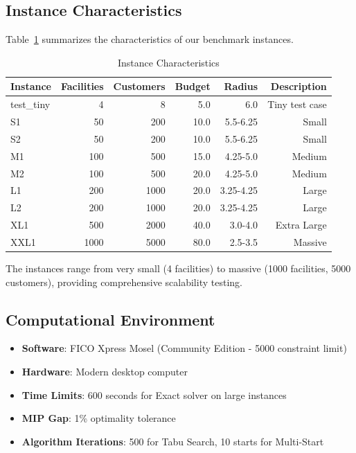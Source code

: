 \documentclass[11pt,a4paper]{article}
\begin{document}
\subsection{Instance Characteristics}

Table~\ref{tab:instances} summarizes the characteristics of our benchmark instances.

\begin{table}[h]
\centering
\caption{Instance Characteristics}
\label{tab:instances}
\begin{tabular}{lrrrrr}
\toprule
Instance & Facilities & Customers & Budget & Radius & Description \\
\midrule
test\_tiny & 4 & 8 & 5.0 & 6.0 & Tiny test case \\
S1 & 50 & 200 & 10.0 & 5.5-6.25 & Small \\
S2 & 50 & 200 & 10.0 & 5.5-6.25 & Small \\
M1 & 100 & 500 & 15.0 & 4.25-5.0 & Medium \\
M2 & 100 & 500 & 20.0 & 4.25-5.0 & Medium \\
L1 & 200 & 1000 & 20.0 & 3.25-4.25 & Large \\
L2 & 200 & 1000 & 20.0 & 3.25-4.25 & Large \\
XL1 & 500 & 2000 & 40.0 & 3.0-4.0 & Extra Large \\
XXL1 & 1000 & 5000 & 80.0 & 2.5-3.5 & Massive \\
\bottomrule
\end{tabular}
\end{table}

The instances range from very small (4 facilities) to massive (1000 facilities, 5000 customers), providing comprehensive scalability testing.

\subsection{Computational Environment}

\begin{itemize}
  \item \textbf{Software}: FICO Xpress Mosel (Community Edition - 5000 constraint limit)
  \item \textbf{Hardware}: Modern desktop computer
  \item \textbf{Time Limits}: 600 seconds for Exact solver on large instances
  \item \textbf{MIP Gap}: 1\% optimality tolerance
  \item \textbf{Algorithm Iterations}: 500 for Tabu Search, 10 starts for Multi-Start
\end{itemize}
\end{document}
